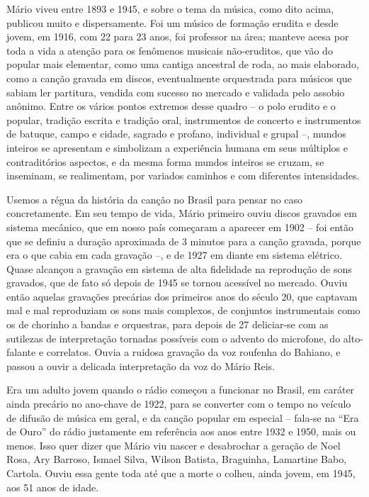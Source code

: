 Mário viveu entre 1893 e 1945, e sobre o tema da música, como dito
acima, publicou muito e dispersamente. Foi um músico de formação erudita
e desde jovem, em 1916, com 22 para 23 anos, foi professor na área;
manteve acesa por toda a vida a atenção para os fenômenos musicais
não-eruditos, que vão do popular mais elementar, como uma cantiga
ancestral de roda, ao mais elaborado, como a canção gravada em discos,
eventualmente orquestrada para músicos que sabiam ler partitura, vendida
com sucesso no mercado e validada pelo assobio anônimo. Entre os vários
pontos extremos desse quadro -- o polo erudito e o popular, tradição
escrita e tradição oral, instrumentos de concerto e instrumentos de
batuque, campo e cidade, sagrado e profano, individual e grupal --,
mundos inteiros se apresentam e simbolizam a experiência humana em seus
múltiplos e contraditórios aspectos, e da mesma forma mundos inteiros se
cruzam, se inseminam, se realimentam, por variados caminhos e com
diferentes intensidades.

Usemos a régua da história da canção no Brasil para pensar no caso
concretamente. Em seu tempo de vida, Mário primeiro ouviu discos
gravados em sistema mecânico, que em nosso país começaram a aparecer em
1902 -- foi então que se definiu a duração aproximada de 3 minutos para
a canção gravada, porque era o que cabia em cada gravação --, e de 1927
em diante em sistema elétrico. Quase alcançou a gravação em sistema de
alta fidelidade na reprodução de sons gravados, que de fato só depois de
1945 se tornou acessível no mercado. Ouviu então aquelas gravações
precárias dos primeiros anos do século 20, que captavam mal e mal
reproduziam os sons mais complexos, de conjuntos instrumentais como os
de chorinho a bandas e orquestras, para depois de 27 deliciar-se com as
sutilezas de interpretação tornadas possíveis com o advento do
microfone, do alto-falante e correlatos. Ouvia a ruidosa gravação da voz
roufenha do Bahiano, e passou a ouvir a delicada interpretação da voz do
Mário Reis.

Era um adulto jovem quando o rádio começou a funcionar no Brasil, em
caráter ainda precário no ano-chave de 1922, para se converter com o
tempo no veículo de difusão de música em geral, e da canção popular em
especial -- fala-se na ``Era de Ouro'' do rádio justamente em referência
aos anos entre 1932 e 1950, mais ou menos. Isso quer dizer que Mário viu
nascer e desabrochar a geração de Noel Rosa, Ary Barroso, Ismael Silva,
Wilson Batista, Braguinha, Lamartine Babo, Cartola. Ouviu essa gente
toda até que a morte o colheu, ainda jovem, em 1945, aos 51 anos de
idade.

